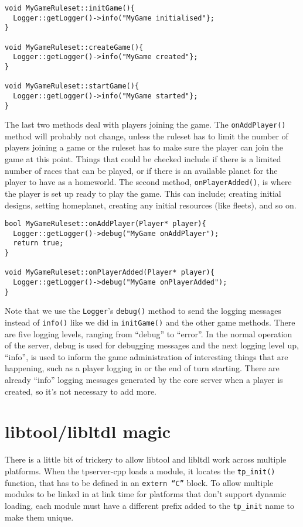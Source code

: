 \documentclass[a4paper,11pt]{report}
\newcommand{\codename}[1]{\texttt{#1}}
\begin{document}
\begin{verbatim}
void MyGameRuleset::initGame(){
  Logger::getLogger()->info("MyGame initialised"};
}

void MyGameRuleset::createGame(){
  Logger::getLogger()->info("MyGame created"};
}

void MyGameRuleset::startGame(){
  Logger::getLogger()->info("MyGame started"};
}
\end{verbatim}

The last two methods deal with players joining the game. The \codename{onAddPlayer()} method will probably not change, unless the ruleset has to limit the number of players joining a game or the ruleset has to make sure the player can join the game at this point. Things that could be checked include if there is a limited number of races that can be played, or if there is an available planet for the player to have as a homeworld. The second method, \codename{onPlayerAdded()}, is where the player is set up ready to play the game. This can include; creating initial designs, setting homeplanet, creating any initial resources (like fleets), and so on.

\begin{verbatim}
bool MyGameRuleset::onAddPlayer(Player* player){
  Logger::getLogger()->debug("MyGame onAddPlayer");
  return true;
}

void MyGameRuleset::onPlayerAdded(Player* player){
  Logger::getLogger()->debug("MyGame onPlayerAdded");
}
\end{verbatim}

Note that we use the \codename{Logger}'s \codename{debug()} method to send the logging messages instead of \codename{info()} like we did in \codename{initGame()} and the other game methods. There are five logging levels, ranging from ``debug'' to ``error''. In the normal operation of the server, debug is used for debugging messages and the next logging level up, ``info'', is used to inform the game administration of interesting things that are happening, such as a player logging in or the end of turn starting. There are already ``info'' logging messages generated by the core server when a player is created, so it's not necessary to add more.


\section{libtool/libltdl magic}
There is a little bit of trickery to allow libtool and libltdl work across multiple platforms. When the tpserver-cpp loads a module, it locates the \codename{tp\_init()} function, that has to be defined in an \codename{extern ``C''} block. To allow multiple modules to be linked in at link time for platforms that don't support dynamic loading, each module must have a different prefix added to the \codename{tp\_init} name to make them unique.
\end{document}
